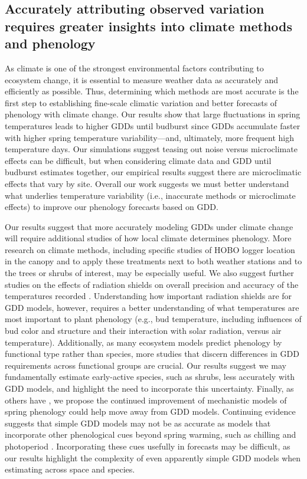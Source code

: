 \documentclass{article}\usepackage[]{graphicx}\usepackage[]{color}
\begin{document}
\subsection*{Accurately attributing observed variation requires greater insights into climate methods and phenology} 
As climate is one of the strongest environmental factors contributing to ecosystem change, it is essential to measure weather data as accurately and efficiently as possible. Thus, determining which methods are most accurate is the first step to establishing fine-scale climatic variation and better forecasts of phenology with climate change. Our results show that large fluctuations in spring temperatures leads to higher GDDs until budburst since GDDs accumulate faster with higher spring temperature variability---and, ultimately, more frequent high temperature days. Our simulations suggest teasing out noise versus microclimate effects can be difficult, but when considering climate data and GDD until budburst estimates together, our empirical results suggest there are microclimatic effects that vary by site. Overall our work suggests we must better understand what underlies temperature variability (i.e., inaccurate methods or microclimate effects) to improve our phenology forecasts based on GDD.
  
Our results suggest that more accurately modeling GDDs under climate change will require additional studies of how local climate determines phenology. More research on climate methods, including specific studies of HOBO logger location in the canopy and to apply these treatments next to both weather stations and to the trees or shrubs of interest, may be especially useful. We also suggest further studies on the effects of radiation shields on overall precision and accuracy of the temperatures recorded \citep{daCunha2015}. Understanding how important radiation shields are for GDD models, however, requires a better understanding of what temperatures are most important to plant phenology (e.g., bud temperature, including influences of bud color and structure and their interaction with solar radiation, versus air temperature). Additionally, as many ecosystem models predict phenology by functional type rather than species, more studies that discern differences in GDD requirements across functional groups are crucial. Our results suggest we may fundamentally estimate early-active species, such as shrubs, less accurately with GDD models, and highlight the need to incorporate this uncertainty. Finally, as others have \citep{Duputie2015,Chuine2016}, we propose the continued improvement of mechanistic models of spring phenology could help move away from GDD models. Continuing evidence suggests that simple GDD models may not be as accurate as models that incorporate other phenological cues beyond spring warming, such as chilling and photoperiod \citep{Keenan2019}. Incorporating these cues usefully in forecasts may be difficult, as our results highlight the complexity of even apparently simple GDD models when estimating across space and species. 
\end{document}
